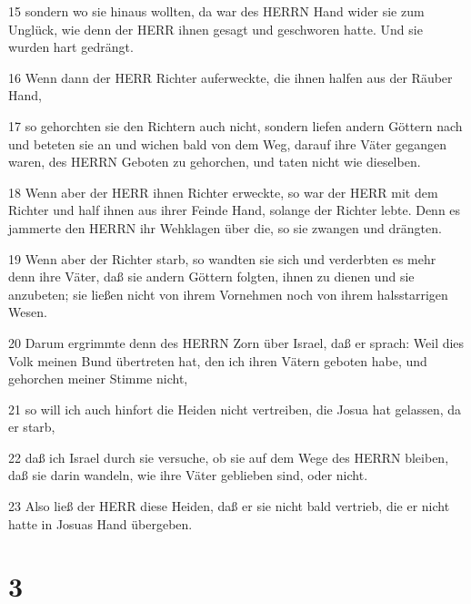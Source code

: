 \par 15 sondern wo sie hinaus wollten, da war des HERRN Hand wider sie zum Unglück, wie denn der HERR ihnen gesagt und geschworen hatte. Und sie wurden hart gedrängt.
\par 16 Wenn dann der HERR Richter auferweckte, die ihnen halfen aus der Räuber Hand,
\par 17 so gehorchten sie den Richtern auch nicht, sondern liefen andern Göttern nach und beteten sie an und wichen bald von dem Weg, darauf ihre Väter gegangen waren, des HERRN Geboten zu gehorchen, und taten nicht wie dieselben.
\par 18 Wenn aber der HERR ihnen Richter erweckte, so war der HERR mit dem Richter und half ihnen aus ihrer Feinde Hand, solange der Richter lebte. Denn es jammerte den HERRN ihr Wehklagen über die, so sie zwangen und drängten.
\par 19 Wenn aber der Richter starb, so wandten sie sich und verderbten es mehr denn ihre Väter, daß sie andern Göttern folgten, ihnen zu dienen und sie anzubeten; sie ließen nicht von ihrem Vornehmen noch von ihrem halsstarrigen Wesen.
\par 20 Darum ergrimmte denn des HERRN Zorn über Israel, daß er sprach: Weil dies Volk meinen Bund übertreten hat, den ich ihren Vätern geboten habe, und gehorchen meiner Stimme nicht,
\par 21 so will ich auch hinfort die Heiden nicht vertreiben, die Josua hat gelassen, da er starb,
\par 22 daß ich Israel durch sie versuche, ob sie auf dem Wege des HERRN bleiben, daß sie darin wandeln, wie ihre Väter geblieben sind, oder nicht.
\par 23 Also ließ der HERR diese Heiden, daß er sie nicht bald vertrieb, die er nicht hatte in Josuas Hand übergeben.

\chapter{3}

